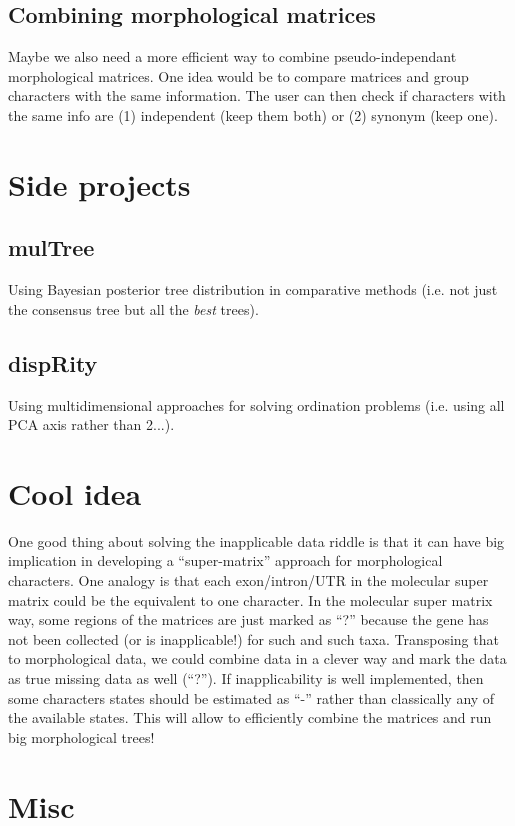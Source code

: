 \documentclass[a4paper,11pt]{article}
\begin{document}
\subsection{Combining morphological matrices}
Maybe we also need a more efficient way to combine pseudo-independant morphological matrices.
One idea would be to compare matrices and group characters with the same information.
The user can then check if characters with the same info are (1) independent (keep them both) or (2) synonym (keep one).


\section{Side projects}
\subsection{mulTree}
Using Bayesian posterior tree distribution in comparative methods (i.e. not just the consensus tree but all the \textit{best} trees).

\subsection{dispRity}
Using multidimensional approaches for solving ordination problems (i.e. using all PCA axis rather than 2...).



\section{Cool idea}
One good thing about solving the inapplicable data riddle is that it can have big implication in developing a ``super-matrix'' approach for morphological characters.
One analogy is that each exon/intron/UTR in the molecular super matrix could be the equivalent to one character.
In the molecular super matrix way, some regions of the matrices are just marked as ``?'' because the gene has not been collected (or is inapplicable!) for such and such taxa.
Transposing that to morphological data, we could combine data in a clever way and mark the data as true missing data as well (``?'').
If inapplicability is well implemented, then some characters states should be estimated as ``-'' rather than classically any of the available states.
This will allow to efficiently combine the matrices and run big morphological trees!


\section{Misc}
\end{document}

